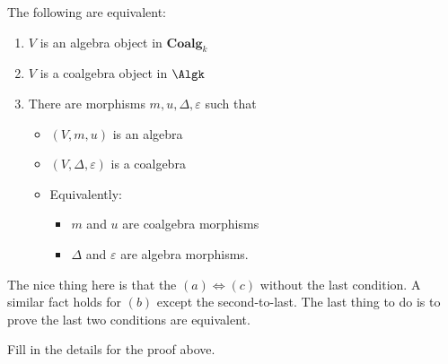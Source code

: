 \documentclass[12pt]{article}
\newcommand*{\Coalgk}{\mathbf{Coalg}_k}
\begin{document}
\begin{lem}
	The following are equivalent:
	\begin{enumerate}
		\item $V$ is an algebra object in $\Coalgk$
		\item $V$ is a coalgebra object in $\Algk$
		\item There are morphisms $m,u,\Delta,\varepsilon$ such that
		\begin{itemize}
			\item $(V,m,u)$ is an algebra
			\item $(V,\Delta,\varepsilon)$ is a coalgebra
			\item Equivalently:
			\begin{itemize}
				\item $m$ and $u$ are coalgebra morphisms
				\item $\Delta$ and $\varepsilon$ are algebra morphisms.
			\end{itemize}
		\end{itemize}
	\end{enumerate}
\end{lem}
\begin{prf}
	The nice thing here is that the $(a)\Leftrightarrow (c)$ without the last condition. A similar fact holds
	for $(b)$ except the second-to-last. The last thing to do is to prove the last two conditions are equivalent.
\end{prf}
\begin{prob}
	Fill in the details for the proof above.
\end{prob}
\end{document}
